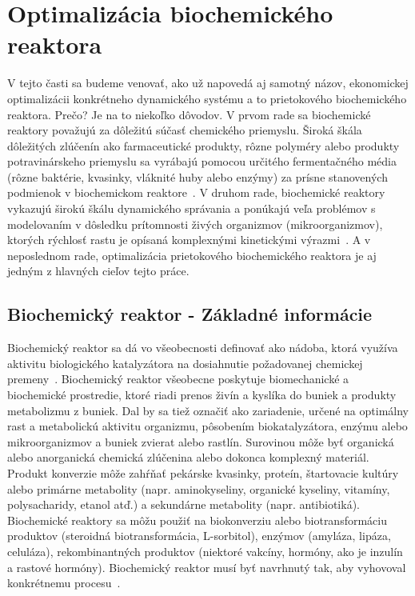 \chapter{Optimalizácia biochemického reaktora}
V tejto časti sa budeme venovať, ako už napovedá aj samotný názov, ekonomickej optimalizácii konkrétneho dynamického systému a to prietokového biochemického reaktora. Prečo? Je na to niekoľko dôvodov. V prvom rade sa biochemické reaktory považujú za dôležitú súčasť chemického priemyslu. Široká škála dôležitých zlúčenín ako farmaceutické produkty, rôzne polyméry alebo produkty potravinárskeho priemyslu sa vyrábajú pomocou určitého fermentačného média (rôzne baktérie, kvasinky, vláknité huby alebo enzýmy) za prísne stanovených podmienok v biochemickom reaktore~\cite{srinivasan:chemostat_opt:2003}. V druhom rade, biochemické reaktory vykazujú širokú škálu dynamického správania a ponúkajú veľa problémov s modelovaním v dôsledku prítomnosti živých organizmov (mikroorganizmov), ktorých rýchlosť rastu je opísaná komplexnými kinetickými výrazmi~\cite{psichogios:hybrid_process_model:1992}. A v neposlednom rade, optimalizácia prietokového biochemického reaktora je aj jedným z hlavných cieľov tejto práce.

\section{Biochemický reaktor - Základné informácie}
Biochemický reaktor sa dá vo všeobecnosti definovať ako nádoba, ktorá využíva aktivitu biologického katalyzátora na dosiahnutie požadovanej chemickej premeny~\cite{kaushik:bioreactors:2014}.
Biochemický reaktor všeobecne poskytuje biomechanické a biochemické prostredie, ktoré riadi prenos živín a kyslíka do buniek a produkty metabolizmu z buniek. Dal by sa tiež označiť ako zariadenie, určené na optimálny rast a metabolickú aktivitu organizmu, pôsobením biokatalyzátora, enzýmu alebo mikroorganizmov a buniek zvierat alebo rastlín. Surovinou môže byť organická alebo anorganická chemická zlúčenina alebo dokonca komplexný materiál. Produkt konverzie môže zahŕňať pekárske kvasinky, proteín, štartovacie kultúry alebo primárne metabolity (napr. aminokyseliny, organické kyseliny, vitamíny, polysacharidy, etanol atď.) a sekundárne metabolity (napr. antibiotiká). Biochemické reaktory sa môžu použiť na biokonverziu alebo biotransformáciu produktov (steroidná biotransformácia, L-sorbitol), enzýmov (amyláza, lipáza, celuláza), rekombinantných produktov (niektoré vakcíny, hormóny, ako je inzulín a rastové hormóny). Biochemický reaktor musí byť navrhnutý tak, aby vyhovoval konkrétnemu procesu~\cite{kaushik:bioreactors:2014}.

